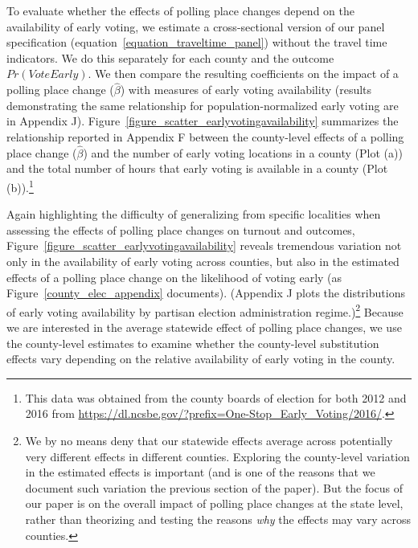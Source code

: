 \documentclass{cup_PSRM}
\begin{document}
To evaluate whether the effects of polling place changes depend on the availability of  early voting,  we estimate a cross-sectional version of our panel specification (equation~\ref{equation_traveltime_panel}) without the travel time indicators.  We do this separately for each county and the outcome $Pr(VoteEarly)$.  We then compare the resulting coefficients on the impact of a polling place change ($\hat{\beta}$) with measures of early voting availability (results demonstrating the same relationship for population-normalized early voting are in Appendix J).  Figure~\ref{figure_scatter_earlyvotingavailability} summarizes the relationship reported in Appendix F between the county-level effects of a polling place change ($\hat{\beta}$) and the number of early voting locations in a county (Plot (a)) and the total number of hours that early voting is available in a county (Plot (b)).\footnote{This data was obtained from the county boards of election for both 2012 and 2016 from \url{https://dl.ncsbe.gov/?prefix=One-Stop_Early_Voting/2016/}.}

Again highlighting the difficulty of generalizing from specific localities when assessing the effects of polling place changes on turnout and outcomes, Figure~\ref{figure_scatter_earlyvotingavailability} reveals tremendous variation not only in the availability of early voting across counties, but also in the estimated effects of a polling place change on the likelihood of voting early (as Figure~\ref{county_elec_appendix} documents). (Appendix J plots the distributions of early voting availability by partisan election administration regime.)\footnote{We by no means deny that our statewide effects average across potentially very different effects in different counties.  Exploring the county-level variation in the estimated effects is important (and is one of the reasons that we document such variation the previous section of the paper).  But the focus of our paper is on the overall impact of polling place changes at the state level, rather than theorizing and testing the reasons \emph{why} the effects may vary across counties.}  Because we are interested in the average statewide effect of polling place changes, we use the county-level estimates to examine whether the county-level substitution effects vary depending on the relative availability of early voting in the county.
\end{document}
